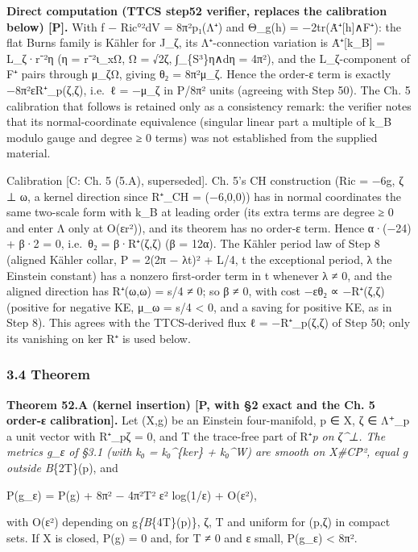 \documentclass[
  10pt,
]{report}
\begin{document}
\textbf{Direct computation (TTCS step52 verifier, replaces the
calibration below) {[}P{]}.} With f − \textbar Ric°\textbar²dV =
8π²p₁(Λ⁺) and Θ\_g(h) = −2tr(Ȧ⁺{[}h{]}∧F⁺): the flat Burns family is
Kähler for J\_ζ, its Λ⁺-connection variation is Ȧ⁺{[}k\_B{]} = L\_ζ·r⁻²η
(η = r⁻²ι\_xΩ, Ω = √2ζ, ∫\_\{S³\}η∧dη = 4π²), and the L\_ζ-component of
F⁺ pairs through μ\_ζΩ, giving θ₂ = 8π²μ\_ζ. Hence the order-ε term is
exactly −8π²εR⁺\_p(ζ,ζ), i.e.~ℓ = −μ\_ζ in P/8π² units (agreeing with
Step 50). The Ch. 5 calibration that follows is retained only as a
consistency remark: the verifier notes that its normal-coordinate
equivalence (singular linear part a multiple of k\_B modulo gauge and
degree ≥ 0 terms) was not established from the supplied material.

Calibration {[}C: Ch. 5 (5.A), superseded{]}. Ch. 5's CH construction
(Ric = −6g, ζ ⊥ ω, a kernel direction since R⁺\_CH = (−6,0,0)) has in
normal coordinates the same two-scale form with k\_B at leading order
(its extra terms are degree ≥ 0 and enter Λ only at O(εr²)), and its
theorem has no order-ε term. Hence α·(−24) + β·2 = 0, i.e.~θ₂ =
β·R⁺(ζ,ζ) (β = 12α). The Kähler period law of Step 8 (aligned Kähler
collar, P = 2(2π − λt)² + L/4, t the exceptional period, λ the Einstein
constant) has a nonzero first-order term in t whenever λ ≠ 0, and the
aligned direction has R⁺(ω,ω) = s/4 ≠ 0; so β ≠ 0, with cost −εθ₂ ∝
−R⁺(ζ,ζ) (positive for negative KE, μ\_ω = s/4 \textless{} 0, and a
saving for positive KE, as in Step 8). This agrees with the TTCS-derived
flux ℓ = −R⁺\_p(ζ,ζ) of Step 50; only its vanishing on ker R⁺ is used
below.

\hypertarget{theorem}{%
\subsubsection{3.4 Theorem}\label{theorem}}

\textbf{Theorem 52.A (kernel insertion) {[}P, with §2 exact and the Ch.
5 order-ε calibration{]}.} Let (X,g) be an Einstein four-manifold, p ∈
X, ζ ∈ Λ⁺\_p a unit vector with R⁺\_pζ = 0, and T the trace-free part of
R⁺\emph{p on ζ\^{}⊥. The metrics g\_ε of §3.1 (with k₀ = k₀\^{}\{ker\} +
k₀\^{}W) are smooth on X\#CP̄², equal g outside B}\{2T\}(p), and

P(g\_ε) = P(g) + 8π² − 4π²\textbar T\textbar² ε² log(1/ε) + O(ε²),

with O(ε²) depending on g\textbar{}\emph{\{B}\{4T\}(p)\}, ζ, T and
uniform for (p,ζ) in compact sets. If X is closed, P(g) = 0 and, for T ≠
0 and ε small, P(g\_ε) \textless{} 8π².
\end{document}
